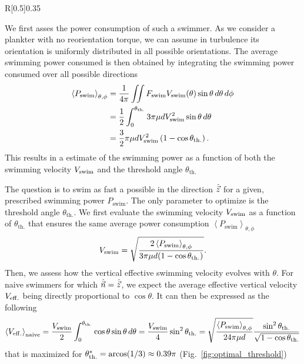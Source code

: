 \begin{wrapfigure}[11]{R}[0.5\width]{0.35\textwidth}
	\centering
	\def\svgwidth{0.3\textwidth}
	
	\captionsetup{width=0.3\textwidth}
  	\caption{Illustration of the optimal threshold angle $\theta_{\mathrm{th.}}^*$.}
  	\label{fig:optimal_threshold}
\end{wrapfigure}
We first asses the power consumption of such a swimmer.
As we consider a plankter with no reorientation torque, we can assume in turbulence its orientation is uniformly distributed in all possible orientations.
The average swimming power consumed is then obtained by integrating the swimming power consumed over all possible directions
\begin{align}
	\left\langle P_{\mathrm{swim}} \right\rangle_{\theta, \phi} &= \frac{1}{4\pi} \iint F_{\mathrm{swim}} V_{\mathrm{swim}}(\theta) \sin \theta \, d\theta \, d\phi \nonumber \\
	&= \frac{1}{2} \int_0^{\theta_{\mathrm{th.}}} 3 \pi \mu d V_{\mathrm{swim}}^2 \sin \theta \, d\theta \nonumber \\
	&= \frac{3}{2} \pi \mu d V_{\mathrm{swim}}^2 \left( 1 - \cos \theta_{\mathrm{th.}} \right).
\end{align}
This results in a estimate of the swimming power as a function of both the swimming velocity $V_{\mathrm{swim}}$ and the threshold angle $\theta_{\mathrm{th.}}$

The question is to swim as fast a possible in the direction $\hat{\vec{z}}$ for a given, prescribed swimming power $P_{\mathrm{swim}}$.
The only parameter to optimize is the threshold angle $\theta_{\mathrm{th.}}$.
We first evaluate the swimming velocity $V_{\mathrm{swim}}$ as a function of $\theta_{\mathrm{th.}}$ that ensures the same average power consumption $\left\langle P_{\mathrm{swim}} \right\rangle_{\theta, \phi}$
\begin{equation}\label{eq:energy_swimming_velocity}
	V_{\mathrm{swim}} =  \sqrt{\frac{2 \left\langle P_{\mathrm{swim}} \right\rangle_{\theta, \phi}}{3 \pi \mu d (1 - \cos \theta_{\mathrm{th.}})}}.
\end{equation} 
Then, we assess how the vertical effective swimming velocity evolves with $\theta$.
For naive swimmers for which $\hat{\vec{n}} = \hat{\vec{z}}$, we expect the average effective vertical velocity $V_{\mathrm{eff.}}$ being directly proportional to $\cos \theta$. 
It can then be expressed as the following
\begin{equation}\label{eq:perf_naive}
	\left\langle V_{\mathrm{eff.}} \right\rangle_{\mathrm{naive}} = \frac{V_{\mathrm{swim}}}{2} \int_0^{\theta_{\mathrm{th.}}} \cos \theta \sin \theta \, d\theta = \frac{V_{\mathrm{swim}}}{4} \sin^2 \theta_{\mathrm{th.}} = \sqrt{\frac{\left\langle P_{\mathrm{swim}} \right\rangle_{\theta, \phi}}{24 \pi \mu d}} \frac{\sin^2 \theta_{\mathrm{th.}}}{\sqrt{1 - \cos \theta_{\mathrm{th.}}}}
\end{equation}
that is maximized for $\theta_{\mathrm{th.}}^* = \operatorname{arcos} (1/3) \approx 0.39 \pi$ (Fig.~\ref{fig:optimal_threshold})

